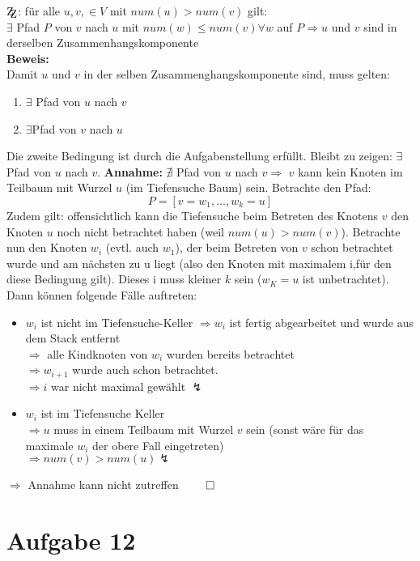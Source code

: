 \documentclass[10pt,a4paper]{article}
\newcommand{\zz}{\mathrm{Z\kern-.3em\raise-0.5ex\hbox{Z}}}
\begin{document}
	$\zz$: für alle $u,v, \in V$ mit $num(u) > num(v)$ gilt:\\
	$\exists$ Pfad $P$ von $v$ nach $u$ mit $num(w) \leq num(v) \forall w$
	auf $P \Rightarrow u$ und $v$ sind in derselben Zusammenhangskomponente
	\\
	\textbf{Beweis:}\\
	Damit $u$ und $v$ in der selben Zusammenghangskomponente sind, muss gelten:
	\begin{enumerate}[label={\alph*.}]
		\item
			$\exists$ Pfad von $u$ nach $v$
		\item
			$\exists$Pfad von $v$ nach $u$
	\end{enumerate}

	Die zweite Bedingung ist durch die Aufgabenstellung erfüllt. Bleibt zu zeigen:
	$\exists$ Pfad von $u$ nach $v$. \textbf{Annahme:} $\nexists$
	Pfad von $u$ nach $v \Rightarrow$ $v$ kann kein Knoten im Teilbaum mit
	Wurzel $u$ (im Tiefensuche Baum) sein. Betrachte den Pfad:
	$$
		P = [v = w_1, \ldots, w_k = u]
	$$
	Zudem gilt: offensichtlich kann die Tiefensuche beim Betreten des Knotens $v$
	den Knoten $u$ noch nicht betrachtet haben (weil $num(u) > num(v)$).
	Betrachte nun den Knoten $w_i$ (evtl. auch $w_1$), der beim Betreten von $v$ schon betrachtet
	wurde und am nächsten zu u liegt (also den Knoten mit maximalem i,für den diese
	Bedingung gilt). Dieses i muss kleiner $k$ sein ($w_K = u$ ist unbetrachtet).
	Dann können folgende Fälle auftreten:
	\begin{itemize}
		\item $w_i$ ist nicht im Tiefensuche-Keller
			$\Rightarrow w_i$ ist fertig abgearbeitet und wurde aus
			dem Stack entfernt \\
			$\Rightarrow $ alle Kindknoten von $w_i$ wurden bereits betrachtet\\
			$\Rightarrow w_{i+1}$ wurde auch schon betrachtet.\\
			$\Rightarrow i$ war nicht maximal gewählt $\lightning$
		\item $w_i$ ist im Tiefensuche Keller \\
			$\Rightarrow u$ muss in einem Teilbaum mit Wurzel $v$ sein (sonst wäre für das maximale $w_i$
				der obere Fall eingetreten)\\
			$\Rightarrow num(v) > num(u) \lightning$
	\end{itemize}
	$\Rightarrow$ Annahme kann nicht zutreffen \hfill $\qed$

\section*{Aufgabe 12}
\end{document}
